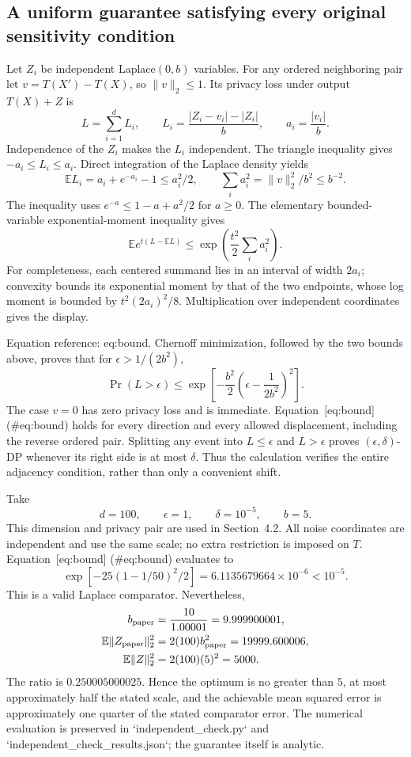 \documentclass[10pt]{article}
\begin{document}
\subsection*{A uniform guarantee satisfying every original sensitivity condition}
Let \(Z_i\) be independent \(\mathrm{Laplace}(0,b)\) variables. For any ordered neighboring pair let \(v=T(X')-T(X)\), so \(\|v\|_2\leq1\). Its privacy loss under output \(T(X)+Z\) is \[L=\sum_{i=1}^d L_i,\qquad
 L_i=\frac{|Z_i-v_i|-|Z_i|}{b},\qquad
 a_i=\frac{|v_i|}{b}.\] Independence of the \(Z_i\) makes the \(L_i\) independent. The triangle inequality gives \(-a_i\leq L_i\leq a_i\). Direct integration of the Laplace density yields \[\mathbb E L_i=a_i+e^{-a_i}-1\leq a_i^2/2,\qquad
 \sum_i a_i^2=\|v\|_2^2/b^2\leq b^{-2}.\] The inequality uses \(e^{-a}\leq1-a+a^2/2\) for \(a\geq0\). The elementary bounded-variable exponential-moment inequality gives \[\mathbb E e^{t(L-\mathbb E L)}
 \leq \exp\!\left(\frac{t^2}{2}\sum_i a_i^2\right).\] For completeness, each centered summand lies in an interval of width \(2a_i\); convexity bounds its exponential moment by that of the two endpoints, whose log moment is bounded by \(t^2(2a_i)^2/8\). Multiplication over independent coordinates gives the display.\par
Equation reference: eq:bound. Chernoff minimization, followed by the two bounds above, proves that for \(\epsilon>1/(2b^2)\), \[
 \Pr(L>\epsilon)
 \leq \exp\!\left[-\frac{b^2}{2}
       \left(\epsilon-\frac{1}{2b^2}\right)^2\right].\] The case \(v=0\) has zero privacy loss and is immediate. Equation [eq:bound] (\#eq:bound) holds for every direction and every allowed displacement, including the reverse ordered pair. Splitting any event into \(L\leq\epsilon\) and \(L>\epsilon\) proves \((\epsilon,\delta)\)-DP whenever its right side is at most \(\delta\). Thus the calculation verifies the entire adjacency condition, rather than only a convenient shift.\par
Take \[d=100,\qquad \epsilon=1,\qquad \delta=10^{-5},\qquad b=5.\] This dimension and privacy pair are used in Section 4.2. All noise coordinates are independent and use the same scale; no extra restriction is imposed on \(T\). Equation [eq:bound] (\#eq:bound) evaluates to \[\exp[-25(1-1/50)^2/2]
 =6.1135679664\times10^{-6}<10^{-5}.\] This is a valid Laplace comparator. Nevertheless, \[\begin{aligned}
 b_{\rm paper}&=\frac{10}{1.00001}=9.999900001,\\
 \mathbb E\|Z_{\rm paper}\|_2^2&=2(100)b_{\rm paper}^2
       =19999.600006,\\
 \mathbb E\|Z\|_2^2&=2(100)(5)^2=5000.\end{aligned}\] The ratio is \(0.250005000025\). Hence the optimum is no greater than \(5\), at most approximately half the stated scale, and the achievable mean squared error is approximately one quarter of the stated comparator error. The numerical evaluation is preserved in `independent\_check.py` and `independent\_check\_results.json`; the guarantee itself is analytic.\par
\end{document}
